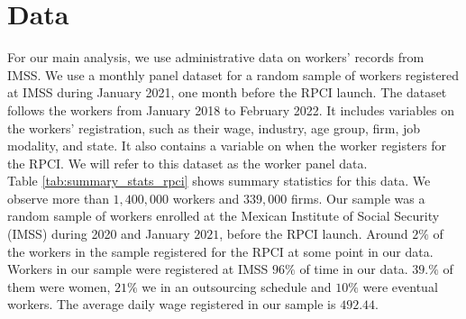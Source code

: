 \documentclass[10pt, oneside]{book}
\begin{document}
\chapter{Data} \label{data}

For our main analysis, we use administrative data on workers' records from IMSS. We use a monthly panel dataset for a random sample of workers registered at IMSS during January 2021, one month before the RPCI launch. The dataset follows the workers from January 2018 to February 2022. It includes variables on the workers' registration, such as their wage, industry, age group, firm, job modality, and state. It also contains a variable on when the worker registers for the RPCI. We will refer to this dataset as the worker panel data. \\ 

Table \ref{tab:summary_stats_rpci} shows summary statistics for this data. We observe more than $1,400,000$ workers and $339,000$ firms. Our sample was a random sample of workers enrolled at the Mexican Institute of Social Security (IMSS) during 2020 and January $2021$, before the RPCI launch. Around $2\%$ of the workers in the sample registered for the RPCI at some point in our data. Workers in our sample were registered at IMSS $96\%$ of time in our data. $39.\%$ of them were women, $21\%$ we in an outsourcing schedule and $10\%$ were eventual workers. The average daily wage registered in our sample is $492.44$. \\
\end{document}
